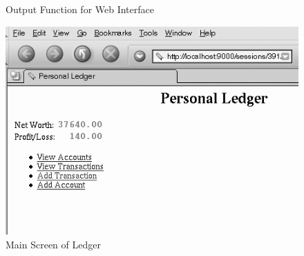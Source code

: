 \documentclass [11pt]{book}
\begin{document}
\begin{figure}
\begin{lrbox}{\boxedverb}
\begin{minipage}{\linewidth}
{\begin{verbatim}
\end{verbatim}}
\end{minipage}
\end{lrbox}
\fbox{\usebox{\boxedverb}}

\caption{Output Function for Web Interface}

\label{code:ledger-html-bottom}

\end{figure}

\begin{figure}
\begin{center}
\includegraphics{../images/ledger-main.png}
\end{center}

\caption{Main Screen of Ledger}

\label{fig:ledger-main}

\end{figure}
\end{document}
